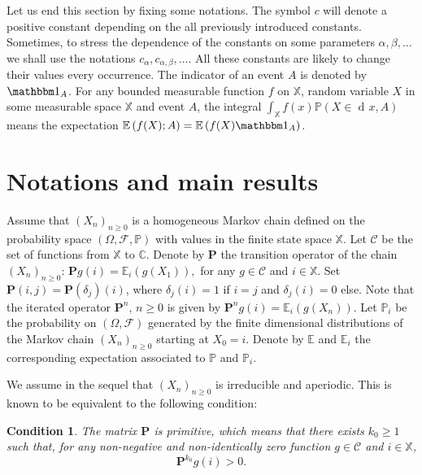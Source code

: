 \documentclass[12pt]{amsart}
\newtheorem{condition}{Condition}
\theoremstyle{definition}
\numberwithin{equation}{section}
\def\bb#1{\mathbb{#1}}
\def\bf#1{\mathbf{#1}}
\def\scr#1{\mathscr{#1}}
\def\geq{\geqslant}
\DeclareMathOperator{\dd}{d\!}
\begin{document}
Let us end this section by fixing some notations. The symbol $c$ will denote a positive constant depending on the all previously introduced constants. Sometimes, to stress the dependence of the constants on some parameters 
 $\alpha,\beta,\dots$ we shall use the notations $ c_{\alpha}, c_{\alpha,\beta},\dots$. All these constants are likely to change their values every occurrence. 
The indicator of an event $A$ is denoted by $\mathbbm 1_A$. For any bounded measurable function $f$ on $\bb X$, random variable $X$ in some measurable space $\bb X$ and event $A$, the integral $\int_{\bb X}  f(x) \bb P (X \in \dd x, A)$ means the expectation $\bb E\left( f(X); A\right)=\bb E \left(f(X) \mathbbm 1_A\right)$.



\section{Notations and main results} \label{sec not res}


 
Assume that $\left( X_n \right)_{n\geq 0}$  is a homogeneous Markov chain defined
on the probability space $\left( \Omega, \scr F, \bb P \right)$ 
with values in the finite state space $\bb X$. Let $\scr C$ be the set of functions from $\bb X$ to $\bb C$. 
Denote by $\bf P$ the transition operator of the chain $(X_n)_{n\geq 0}$: 
$
\bf P g(i) = \bb E_i \left( g(X_1) \right),
$
for any $g \in \scr C$ and $i \in \bb X$. 
Set $\bf P(i,j) = \bf P(\delta_j)(i)$, where $\delta_j(i) = 1$ if $i = j$ and $\delta_j(i) = 0$ else. 
Note that the iterated operator $\bf P^n$, $n \geq 0$ is given by
$
\bf P^ng(i) = \bb E_i \left( g(X_n) \right).
$
Let $\bb P_i$ be the probability on $\left( \Omega, \scr F \right)$  generated by the finite dimensional distributions 
of the Markov chain $\left( X_n \right)_{n\geq 0}$ starting at $X_0 = i$. 
Denote by $\bb E$ and $\bb E_i$ the corresponding expectation associated to $\bb P$ and $\bb P_i.$

We assume in the sequel that $\left( X_n \right)_{n\geq 0}$ is irreducible and aperiodic. This
is known to be equivalent to the following condition:
\begin{condition}
\label{primitif}
The matrix $\bf P$ is primitive, which means that there exists $k_0 \geq 1$ such that, for any non-negative and non-identically zero function $g\in \scr C$ and $i \in \bb X$,
\[
\bf P^{k_0} g(i) > 0.
\]
\end{condition}
\end{document}
